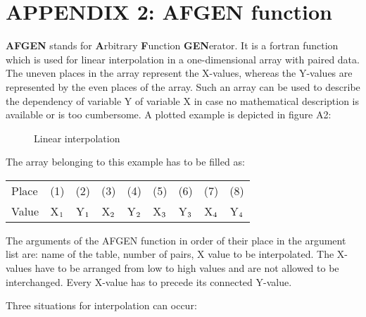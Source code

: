 \chapter{APPENDIX 2: AFGEN function} 


{\bf AFGEN} stands for {\bf A}rbitrary {\bf F}unction {\bf GEN}erator. It is a fortran function 
which is used for
linear interpolation in a one-dimensional array with paired data. The uneven places in the
array represent the X-values, whereas the Y-values are represented by the even places of the
array. Such an array can be used to describe the dependency of variable Y of variable X in
case no mathematical description is available or is too cumbersome. A plotted example is
depicted in figure A2:

\begin{figure}[htbp]
 \centering
 \caption{Linear interpolation}
 \label{fig:afgen}    
\end{figure}

The array belonging to this example has to be filled as:\\

\begin{center}
\begin{tabular}{lcccccccc}
Place & (1)& (2)& (3)& (4)& (5)& (6)& (7)& (8)\\
Value & X$_{{\rm 1}}$ & Y$_{{\rm 1}}$   & X$_{{\rm 2}}$& Y$_{{\rm 2}}$   & X$_{{\rm 3}}$ & Y$_{{\rm 3}}$   & X$_{{\rm 4}}$ & Y$_{{\rm 4}}$\\
\end{tabular}
\end{center}

The arguments of the AFGEN function in order of their place in the argument list are: name
of the table, number of pairs, X value to be interpolated. The X-values have to be arranged
from low to high values and are not allowed to be interchanged. Every X-value has to
precede its connected Y-value.

Three situations for interpolation can occur:

